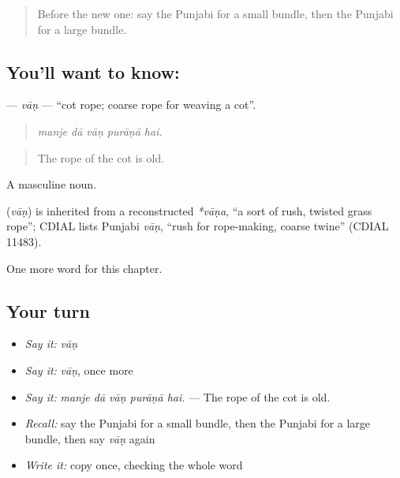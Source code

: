 \label{lesson:PA-C252-van}



\begin{quote}
Before the new one: say the Punjabi for a small bundle, then the Punjabi for a large bundle.
\end{quote}

\subsection*{You'll want to know: }
\textbf{} — \emph{vāṇ} — \textquotedblleft{}cot rope; coarse rope for weaving a cot\textquotedblright{}.

\begin{quote}
    
\end{quote}

\begin{quote}
\emph{manje dā vāṇ purāṇā hai.}
\end{quote}

\begin{quote}
The rope of the cot is old.
\end{quote}

A masculine noun.

\begin{cousinweb}
\textbf{} (\emph{vāṇ}) is inherited from a reconstructed \emph{*vāṇa}, \textquotedblleft{}a sort of rush, twisted grass rope\textquotedblright{}; CDIAL lists Punjabi \emph{vāṇ}, \textquotedblleft{}rush for rope-making, coarse twine\textquotedblright{} (CDIAL 11483).
\end{cousinweb}

\begin{grammarlens}[title={What you've built}]
One more word for this chapter.
\end{grammarlens}

\subsection*{Your turn}
\begin{itemize}
\raggedright
  \item \emph{Say it:} \emph{vāṇ}
  \item \emph{Say it:} \emph{vāṇ}, once more
  \item \emph{Say it:} \emph{manje dā vāṇ purāṇā hai.} — The rope of the cot is old.
  \item \emph{Recall:} say the Punjabi for a small bundle, then the Punjabi for a large bundle, then say \emph{vāṇ} again
  \item \emph{Write it:} copy \textbf{} once, checking the whole word
\end{itemize}

